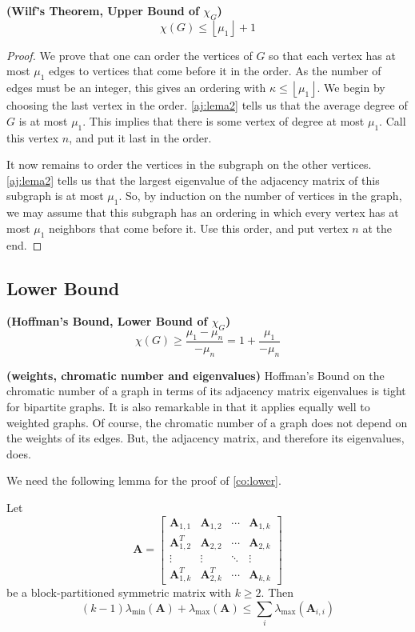 \documentclass{article}
\newcommand{\bfs}[1]{\textbf{({#1}) }}
\begin{document}
\begin{thma}{\bfs{Wilf’s Theorem\cite{wilf1967eigenvalues}, Upper Bound of  $\chi_{G}$}}
$$
\chi(G) \leq\left\lfloor\mu_{1}\right\rfloor+1
$$
\end{thma}

\begin{proof}
We prove that one can order the vertices of $G$ so that each vertex has at most $\mu_{1}$ edges to vertices that come before it in the order. As the number of edges must be an integer, this gives an ordering with $\kappa \leq\left\lfloor\mu_{1}\right\rfloor$.
We begin by choosing the last vertex in the order. \cref{aj:lema2} tells us that the average degree of $G$ is at most $\mu_{1}$. This implies that there is some vertex of degree at most $\mu_{1} .$ Call this vertex $n$, and put it last in the order.

It now remains to order the vertices in the subgraph on the other vertices. \cref{aj:lema2} tells us that the largest eigenvalue of the adjacency matrix of this subgraph is at most $\mu_{1} .$ So, by induction on the number of vertices in the graph, we may assume that this subgraph has an ordering in which every vertex has at most $\mu_{1}$ neighbors that come before it. Use this order, and put vertex $n$ at the end. 
\end{proof} 

\subsection{Lower Bound}
\begin{thma}{\bfs{Hoffman's Bound\cite{hoffman2003eigenvalues}, Lower Bound of  $\chi_{G}$}}\label{co:lower}
$$
\chi(G) \geq \frac{\mu_{1}-\mu_{n}}{-\mu_{n}}=1+\frac{\mu_{1}}{-\mu_{n}}
$$
\end{thma}

\begin{rema}{\bfs{weights, chromatic number and eigenvalues}}
Hoffman's Bound on the chromatic number of a graph in terms of its adjacency matrix eigenvalues is tight for bipartite graphs. It is also remarkable in that it applies equally well to weighted graphs. Of course, the chromatic number of a graph does not depend on the weights of its edges. But, the adjacency matrix, and therefore its eigenvalues, does.
\end{rema}
We need the following lemma for the proof of \cref{co:lower}.
\begin{lema}\label{:co:templemma}
  Let
$$
\boldsymbol{A}=\left[\begin{array}{cccc}
\boldsymbol{A}_{1,1} & \boldsymbol{A}_{1,2} & \cdots & \boldsymbol{A}_{1, k} \\
\boldsymbol{A}_{1,2}^{T} & \boldsymbol{A}_{2,2} & \cdots & \boldsymbol{A}_{2, k} \\
\vdots & \vdots & \ddots & \vdots \\
\boldsymbol{A}_{1, k}^{T} & \boldsymbol{A}_{2, k}^{T} & \cdots & \boldsymbol{A}_{k, k}
\end{array}\right]
$$
be a block-partitioned symmetric matrix with $k \geq 2 .$ Then
$$
(k-1) \lambda_{\min }(\boldsymbol{A})+\lambda_{\max }(\boldsymbol{A}) \leq \sum_{i} \lambda_{\max }\left(\boldsymbol{A}_{i, i}\right)
$$
\end{lema} 
\end{document}
